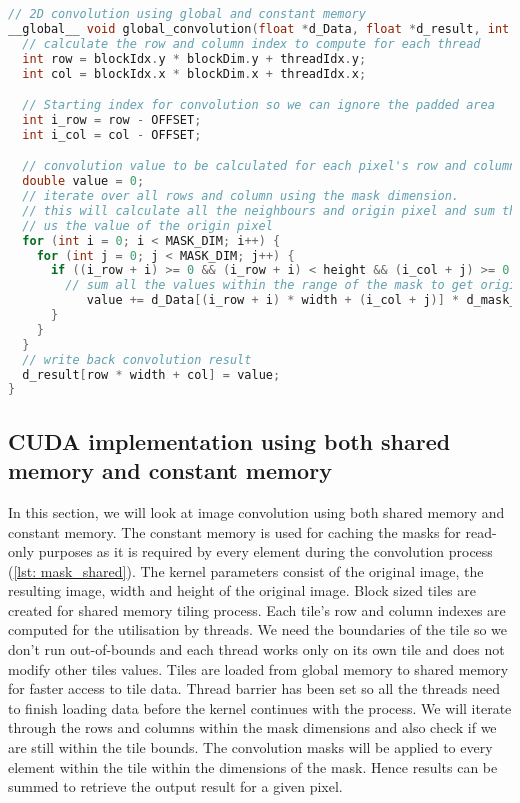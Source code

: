 \begin{lstlisting}[language=C, label={lst: global_convolution}, caption= 2D Convolution using the global memory]
// 2D convolution using global and constant memory
__global__ void global_convolution(float *d_Data, float *d_result, int width, int height) {
  // calculate the row and column index to compute for each thread
  int row = blockIdx.y * blockDim.y + threadIdx.y;
  int col = blockIdx.x * blockDim.x + threadIdx.x;

  // Starting index for convolution so we can ignore the padded area
  int i_row = row - OFFSET;
  int i_col = col - OFFSET;

  // convolution value to be calculated for each pixel's row and column
  double value = 0;
  // iterate over all rows and column using the mask dimension.
  // this will calculate all the neighbours and origin pixel and sum these values to give
  // us the value of the origin pixel
  for (int i = 0; i < MASK_DIM; i++) {
    for (int j = 0; j < MASK_DIM; j++) {
      if ((i_row + i) >= 0 && (i_row + i) < height && (i_col + j) >= 0 && (i_col + j) < width) {
      	// sum all the values within the range of the mask to get origin pixel's value
           value += d_Data[(i_row + i) * width + (i_col + j)] * d_mask_global[i * MASK_DIM + j];
      }
    }
  }
  // write back convolution result
  d_result[row * width + col] = value;
}
\end{lstlisting}


\subsection{CUDA implementation using both shared memory and constant memory}
In this section, we will look at image convolution using both shared memory and constant memory. The constant memory is used for caching the masks for read-only purposes as it is required by every element during the convolution process (\ref{lst: mask_shared}). The kernel parameters consist of the original image, the resulting image, width and height of the original image. Block sized tiles are created for shared memory tiling process. Each tile's row and column indexes are computed for the utilisation by threads. We need the boundaries of the tile so we don't run out-of-bounds and each thread works only on its own tile and does not modify other tiles values. Tiles are loaded from global memory to shared memory for faster access to tile data. Thread barrier has been set so all the threads need to finish loading data before the kernel continues with the process. We will iterate through the rows and columns within the mask dimensions and also check if we are still within the tile bounds. The convolution masks will be applied to every element within the tile within the dimensions of the mask. Hence results can be summed to retrieve the output result for a given pixel.

